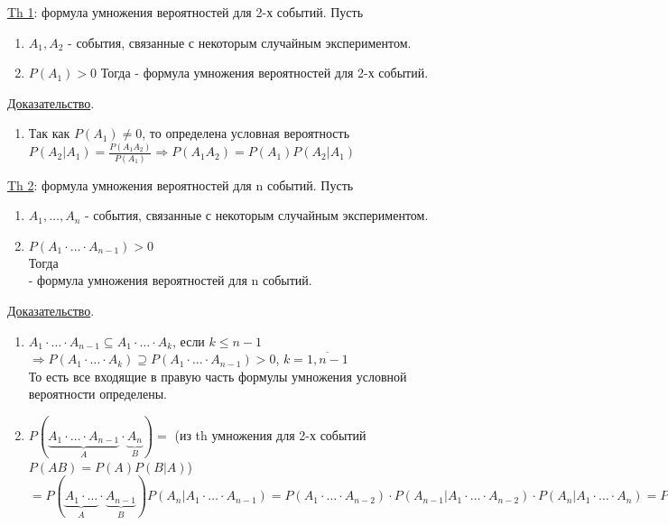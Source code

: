 
\underline{Th 1}: формула умножения вероятностей для 2-х событий.
Пусть
\begin{enumerate}
	\item[1)] 
	$A_1, A_2$ - события, связанные с некоторым случайным экспериментом.
	
	\item[2)]
	$P(A_1) > 0$
	Тогда
	 - формула умножения вероятностей для 2-х событий.
\end{enumerate}

\underline{Доказательство}.
\begin{enumerate}
	\item[1)]
	Так как $P(A_1) \neq 0$, то определена условная вероятность \\
	$P(A_2|A_1) = \frac{P(A_1 A_2)}{P(A_1)} \Rightarrow P(A_1 A_2) = P(A_1) P(A_2|A_1)$
\end{enumerate}

\underline{Th 2}: формула умножения вероятностей для n событий.
Пусть
\begin{enumerate}
	\item[1)]
	$A_1, \ldots , A_n$ - события, связанные с некоторым случайным экспериментом.
	
	\item[2)]
	$P(A_1 \cdot \ldots \cdot A_{n-1}) > 0$ \\
	Тогда \\
	 - формула умножения вероятностей для n событий.
\end{enumerate}

\underline{Доказательство}.
\begin{enumerate}
	\item[1)]
	$A_1 \cdot \ldots \cdot A_{n-1} \subseteq A_1 \cdot \ldots \cdot A_k$, если $k \leqslant n-1$ \\
	$\Rightarrow P(A_1 \cdot \ldots \cdot A_k) \supseteq P(A_1 \cdot \ldots \cdot A_{n-1}) > 0$, $k = \overline{1, n-1}$ \\
	То есть все входящие в правую часть формулы умножения условной вероятности определены.
	
	\item[2)]
	$P(\underbrace{A_1 \cdot \ldots \cdot A_{n-1}}_{A} \cdot \underbrace{A_n}_{B}) =$ (из th умножения для 2-х событий $P(AB) = P(A) P(B|A)$) $ = P(\underbrace{A_1 \cdot \ldots}_{A}  \cdot \underbrace{A_{n-1}}_{B}) P(A_n | A_1 \cdot \ldots \cdot A_{n-1}) = P(A_1 \cdot \ldots \cdot A_{n-2}) \cdot P(A_{n-1}|A_1 \cdot \ldots \cdot A_{n-2}) \cdot P(A_n | A_1 \cdot \ldots \cdot A_n) = P(A_1) \cdot P(A_2 |A_1) \cdot P(A_3 |A_1 A_2) \cdot \ldots \cdot P(A_n |A_1 \cdot \ldots \cdot A_{n-1})$
\end{enumerate}

